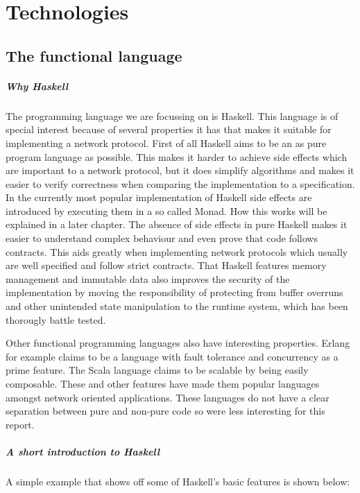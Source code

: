 \chapter{Technologies}
\section{The functional language}
\paragraph{Why Haskell}
The programming language we are focussing on is Haskell.
This language is of special interest because of several properties it has that makes it suitable for implementing a network protocol.
First of all Haskell aims to be an as pure program language as possible. This makes it harder to achieve side effects which are important to a network protocol, but it does simplify algorithms and makes it easier to verify correctness when comparing the implementation to a specification.
In the currently most popular implementation of Haskell side effects are introduced by executing them in a so called Monad.
How this works will be explained in a later chapter.
The absence of side effects in pure Haskell makes it easier to understand complex behaviour and even prove that code follows contracts.
This aids greatly when implementing network protocols which usually are well specified and follow strict contracts.
That Haskell features memory management and immutable data also improves the security of the implementation by moving the responsibility of protecting from buffer overruns and other unintended state manipulation to the runtime system, which has been thorougly battle tested.

Other functional programming languages also have interesting properties.
Erlang for example claims to be a language with fault tolerance and concurrency as a prime feature\cite{armstrong_concurrent_1993}.
The Scala language claims to be scalable by being easily composable\cite{odersky_overview_????}.
These and other features have made them popular languages amongst network oriented applications. %
These languages do not have a clear separation between pure and non-pure code so were less interesting for this report.
\paragraph{A short introduction to Haskell}
A simple example that shows off some of Haskell's basic features is shown below:

